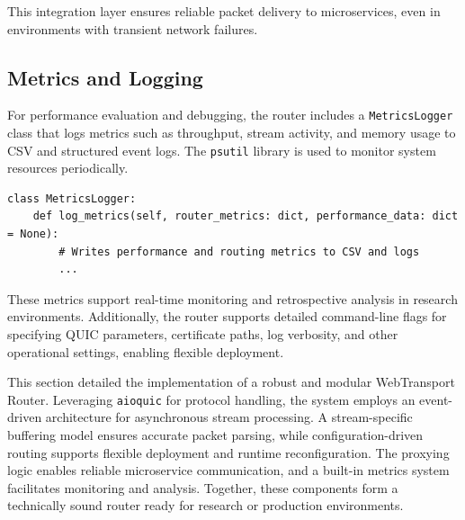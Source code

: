 This integration layer ensures reliable packet delivery to microservices, even in environments with transient network failures.

\subsection{Metrics and Logging}
For performance evaluation and debugging, the router includes a \texttt{MetricsLogger} class that logs metrics such as throughput, stream activity, and memory usage to CSV and structured event logs. The \texttt{psutil} library is used to monitor system resources periodically.

\begin{lstlisting}[breaklines=true,basicstyle=\small\ttfamily,frame=single]
class MetricsLogger:
    def log_metrics(self, router_metrics: dict, performance_data: dict = None):
        # Writes performance and routing metrics to CSV and logs
        ...
\end{lstlisting}

These metrics support real-time monitoring and retrospective analysis in research environments. Additionally, the router supports detailed command-line flags for specifying QUIC parameters, certificate paths, log verbosity, and other operational settings, enabling flexible deployment.

This section detailed the implementation of a robust and modular WebTransport Router. Leveraging \texttt{aioquic} for protocol handling, the system employs an event-driven architecture for asynchronous stream processing. A stream-specific buffering model ensures accurate packet parsing, while configuration-driven routing supports flexible deployment and runtime reconfiguration. The proxying logic enables reliable microservice communication, and a built-in metrics system facilitates monitoring and analysis. Together, these components form a technically sound router ready for research or production environments.








